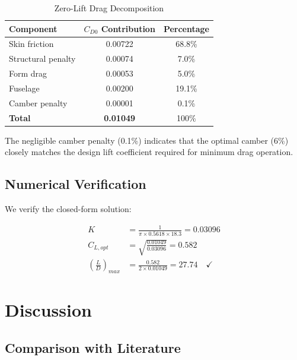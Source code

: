 \documentclass[11pt,a4paper]{article}
\begin{document}
\begin{table}[h]
\centering
\caption{Zero-Lift Drag Decomposition}
\label{tab:drag_breakdown}
\begin{tabular}{lcc}
\hline\hline
Component & $C_{D0}$ Contribution & Percentage \\
\hline
Skin friction & 0.00722 & 68.8\% \\
Structural penalty & 0.00074 & 7.0\% \\
Form drag & 0.00053 & 5.0\% \\
Fuselage & 0.00200 & 19.1\% \\
Camber penalty & 0.00001 & 0.1\% \\
\hline
\textbf{Total} & \textbf{0.01049} & 100\% \\
\hline\hline
\end{tabular}
\end{table}

The negligible camber penalty (0.1\%) indicates that the optimal camber (6\%) closely matches the design lift coefficient required for minimum drag operation.

\subsection{Numerical Verification}

We verify the closed-form solution:

\begin{align}
K &= \frac{1}{\pi \times 0.5618 \times 18.3} = 0.03096 \\
C_{L,opt} &= \sqrt{\frac{0.01049}{0.03096}} = 0.582 \\
\left(\frac{L}{D}\right)_{max} &= \frac{0.582}{2 \times 0.01049} = 27.74 \quad \checkmark
\end{align}

\section{Discussion}

\subsection{Comparison with Literature}
\end{document}
